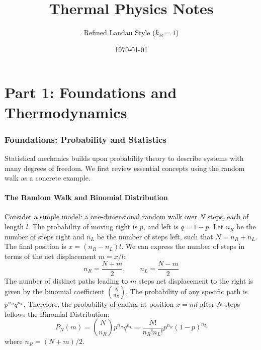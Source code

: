 \documentclass[10pt, letterpaper]{article}
\title{Thermal Physics Notes}
\author{Refined Landau Style ($k_B = 1$)}
\date{\today}
\begin{document}
\maketitle
\tableofcontents
\newpage

\part*{Part 1: Foundations and Thermodynamics}

\section{Foundations: Probability and Statistics}
Statistical mechanics builds upon probability theory to describe systems with many degrees of freedom. We first review essential concepts using the random walk as a concrete example.

\subsection{The Random Walk and Binomial Distribution}
Consider a simple model: a one-dimensional random walk over $N$ steps, each of length $l$. The probability of moving right is $p$, and left is $q=1-p$.
Let $n_R$ be the number of steps right and $n_L$ be the number of steps left, such that $N = n_R + n_L$. The final position is $x = (n_R - n_L)l$.
We can express the number of steps in terms of the net displacement $m = x/l$:
\begin{equation*}
    n_R = \frac{N+m}{2}, \qquad n_L = \frac{N-m}{2}
\end{equation*}
The number of distinct paths leading to $m$ steps net displacement to the right is given by the binomial coefficient $\binom{N}{n_R}$. The probability of any specific path is $p^{n_R} q^{n_L}$.
Therefore, the probability of ending at position $x=ml$ after $N$ steps follows the Binomial Distribution:
\begin{equation}
    P_N(m) = \binom{N}{n_R} p^{n_R} q^{n_L} = \frac{N!}{n_R! n_L!} p^{n_R} (1-p)^{n_L}
\end{equation}
where $n_R = (N+m)/2$.
\end{document}
